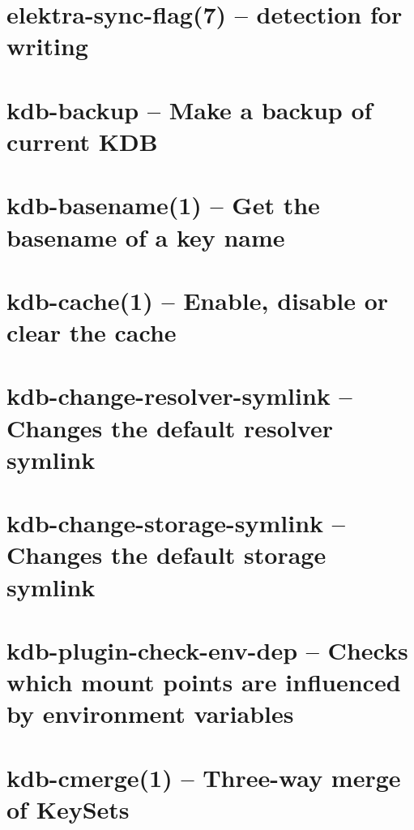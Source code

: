 \let\mypdfximage\pdfximage\def\pdfximage{\immediate\mypdfximage}\documentclass[twoside]{book}
\newcommand{\+}{\discretionary{\mbox{\scriptsize$\hookleftarrow$}}{}{}}
\begin{document}
\chapter{elektra-\/sync-\/flag(7) -- detection for writing}
\label{doc_help_elektra-sync-flag_md}

\chapter{kdb-\/backup -- Make a backup of current KDB}
\label{doc_help_kdb-backup_md}

\chapter{kdb-\/basename(1) -- Get the basename of a key name}
\label{doc_help_kdb-basename_md}

\chapter{kdb-\/cache(1) -- Enable, disable or clear the cache}
\label{doc_help_kdb-cache_md}

\chapter{kdb-\/change-\/resolver-\/symlink -- Changes the default resolver symlink}
\label{doc_help_kdb-change-resolver-symlink_md}

\chapter{kdb-\/change-\/storage-\/symlink -- Changes the default storage symlink}
\label{doc_help_kdb-change-storage-symlink_md}

\chapter{kdb-\/plugin-\/check-\/env-\/dep -- Checks which mount points are influenced by environment variables}
\label{doc_help_kdb-check-env-dep_md}

\chapter{kdb-\/cmerge(1) -- Three-\/way merge of Key\+Sets}
\label{doc_help_kdb-cmerge_md}

\end{document}

